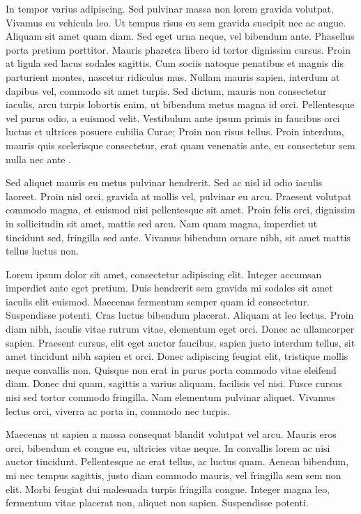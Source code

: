 In tempor varius adipiscing. Sed pulvinar massa non lorem gravida volutpat. Vivamus eu vehicula leo. Ut tempus risus eu sem gravida suscipit nec ac augue. Aliquam sit amet quam diam. Sed eget urna neque, vel bibendum ante. Phasellus porta pretium porttitor. Mauris pharetra libero id tortor dignissim cursus. Proin at ligula sed lacus sodales sagittis. Cum sociis natoque penatibus et magnis dis parturient montes, nascetur ridiculus mus. Nullam mauris sapien, interdum at dapibus vel, commodo sit amet turpis. Sed dictum, mauris non consectetur iaculis, arcu turpis lobortis enim, ut bibendum metus magna id orci. Pellentesque vel purus odio, a euismod velit. Vestibulum ante ipsum primis in faucibus orci luctus et ultrices posuere cubilia Curae; Proin non risus tellus. Proin interdum, mauris quis scelerisque consectetur, erat quam venenatis ante, eu consectetur sem nulla nec ante .

Sed aliquet mauris eu metus pulvinar hendrerit. Sed ac nisl id odio iaculis laoreet. Proin nisl orci, gravida at mollis vel, pulvinar eu arcu. Praesent volutpat commodo magna, et euismod nisi pellentesque sit amet. Proin felis orci, dignissim in sollicitudin sit amet, mattis sed arcu. Nam quam magna, imperdiet ut tincidunt sed, fringilla sed ante. Vivamus bibendum ornare nibh, sit amet mattis tellus luctus non.

Lorem ipsum dolor sit amet, consectetur adipiscing elit. Integer accumsan imperdiet ante eget pretium. Duis hendrerit sem gravida mi sodales sit amet iaculis elit euismod. Maecenas fermentum semper quam id consectetur. Suspendisse potenti. Cras luctus bibendum placerat. Aliquam at leo lectus. Proin diam nibh, iaculis vitae rutrum vitae, elementum eget orci. Donec ac ullamcorper sapien. Praesent cursus, elit eget auctor faucibus, sapien justo interdum tellus, sit amet tincidunt nibh sapien et orci. Donec adipiscing feugiat elit, tristique mollis neque convallis non. Quisque non erat in purus porta commodo vitae eleifend diam. Donec dui quam, sagittis a varius aliquam, facilisis vel nisi. Fusce cursus nisi sed tortor commodo fringilla. Nam elementum pulvinar aliquet. Vivamus lectus orci, viverra ac porta in, commodo nec turpis.

Maecenas ut sapien a massa consequat blandit volutpat vel arcu. Mauris eros orci, bibendum et congue eu, ultricies vitae neque. In convallis lorem ac nisi auctor tincidunt. Pellentesque ac erat tellus, ac luctus quam. Aenean bibendum, mi nec tempus sagittis, justo diam commodo mauris, vel fringilla sem sem non elit. Morbi feugiat dui malesuada turpis fringilla congue. Integer magna leo, fermentum vitae placerat non, aliquet non sapien. Suspendisse potenti.

